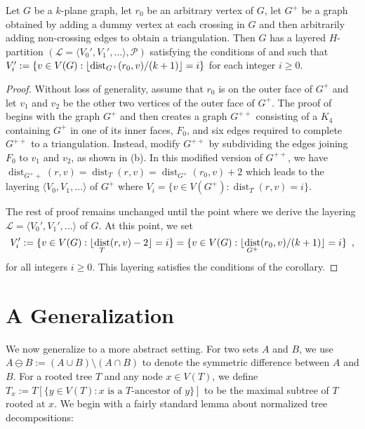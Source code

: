 \documentclass{patmorin}
\DeclareMathOperator{\dist}{dist}
\begin{document}
\begin{cor}
  Let $G$ be a $k$-plane graph, let $r_0$ be an arbitrary vertex of $G$, let $G^+$ be a graph obtained by adding a dummy vertex at each crossing in $G$ and then arbitrarily adding non-crossing edges to obtain a triangulation.  Then $G$ has a layered $H$-partition $(\mathcal{L}=\langle V_0',V_1',\ldots\rangle,\mathcal{P})$ satisfying the conditions of  and such that $V_i' := \{v\in V(G): \floor{\dist_{G^+}(r_0,v)/(k+1)}=i\}$ for each integer $i\ge 0$.
\end{cor}

\begin{proof}
  Without loss of generality, assume that $r_0$ is on the outer face of $G^+$ and let $v_1$ and $v_2$ be the other two vertices of the outer face of $G^+$.
  The proof of  begins with the graph $G^+$ and then creates a graph $G^{++}$ consisting of a $K_4$ containing $G^+$ in one of its inner faces, $F_0$, and six edges required to complete $G^{++}$ to a triangulation.  Instead, modify $G^{++}$ by subdividing the edges joining $F_0$ to $v_1$ and $v_2$, as shown in (b).  In this modified version of $G^{++}$, we have $\dist_{G^++}(r,v)=\dist_{T}(r,v)=\dist_{G^+}(r_0,v)+2$
  which leads to the layering $\langle V_0,V_1,\ldots\rangle$ of $G^+$ where $V_i=\{v\in V(G^+): \dist_{T}(r,v) = i\}$.
  
  The rest of proof remains unchanged until the point where we derive the layering $\mathcal{L}=\langle V_0',V_1',\ldots\rangle$ of $G$.  At this point, we set
  \[  
    V_i' := \{v\in V(G): \floor{\dist_{T}(r,v)-2}=i\} 
         = \{v\in V(G): \floor{\dist_{G^+}(r_0,v)/(k+1)}=i\} \enspace ,
  \]
  for all integers $i\ge 0$.  This layering satisfies the conditions of the corollary.
\end{proof}

\newpage
\section{A Generalization}

We now generalize  to a more abstract setting.  For two sets $A$ and $B$, we use $A\ominus B := (A\cup B)\setminus(A\cap B)$ to denote the symmetric difference between $A$ and $B$.  For a rooted tree $T$ and any node $x\in V(T)$, we define $T_x := T[\{y\in V(T):\mbox{$x$ is a $T$-ancestor of $y$}\}]$ to be the maximal subtree of $T$ rooted at $x$.
We begin with a fairly standard lemma about normalized tree decompositions:
\end{document}
